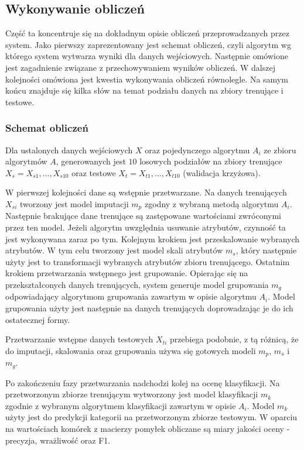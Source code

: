 \documentclass[../thesis.tex]{subfiles}
\begin{document}
\subsection{Wykonywanie obliczeń}

Część ta koncentruje się na dokładnym opisie obliczeń przeprowadzanych przez system. Jako pierwszy zaprezentowany jest schemat obliczeń, czyli algorytm wg którego system wytwarza wyniki dla danych wejściowych. Następnie omówione jest zagadnienie związane z przechowywaniem wyników obliczeń. W dalszej kolejności omówiona jest kwestia wykonywania obliczeń równolegle. Na samym końcu znajduje się kilka słów na temat podziału danych na zbiory trenujące i testowe.

\subsubsection{Schemat obliczeń}
\label{req:research_scheme}

Dla ustalonych danych wejściowych $X$ oraz pojedynczego algorytmu $A_i$ ze zbioru algorytmów $A$, generowanych jest $10$ losowych podziałów na zbiory trenujące $X_{s} = X_{s1}, \ldots, X_{s10}$ oraz testowe $X_{t} = X_{t1}, \ldots, X_{t10}$ (walidacja krzyżowa).

W pierwszej kolejności dane są wstępnie przetwarzane. Na danych trenujących $X_{si}$ tworzony jest model imputacji $m_{p}$ zgodny z wybraną metodą algorytmu $A_i$. Następnie brakujące dane trenujące są zastępowane wartościami zwróconymi przez ten model. Jeżeli algorytm uwzględnia usuwanie atrybutów, czynność ta jest wykonywana zaraz po tym. Kolejnym krokiem jest przeskalowanie wybranych atrybutów. W tym celu tworzony jest model skali atrybutów $m_{s}$, który następnie użyty jest to transformacji wybranych atrybutów zbioru trenującego. Ostatnim krokiem przetwarzania wstępnego jest grupowanie. Opierając się na przekształconych danych trenujących, system generuje model grupowania $m_{g}$ odpowiadający algorytmom grupowania zawartym w opisie algorytmu $A_i$. Model grupowania użyty jest następnie na danych trenujących doprowadzając je do ich ostatecznej formy.

Przetwarzanie wstępne danych testowych $X_{ti}$ przebiega podobnie, z tą różnicą, że do imputacji, skalowania oraz grupowania używa się gotowych modeli $m_p$, $m_s$ i $m_g$.

Po zakończeniu fazy przetwarzania nadchodzi kolej na ocenę klasyfikacji. Na przetworzonym zbiorze trenującym wytworzony jest model klasyfikacji $m_k$ zgodnie z wybranym algorytmem klasyfikacji zawartym w opisie $A_i$. Model $m_k$ użyty jest do predykcji kategorii na przetworzonym zbiorze testowym. W oparciu na wartościach komórek z macierzy pomyłek obliczane są miary jakości oceny - precyzja, wrażliwość oraz F1. 
\end{document}
